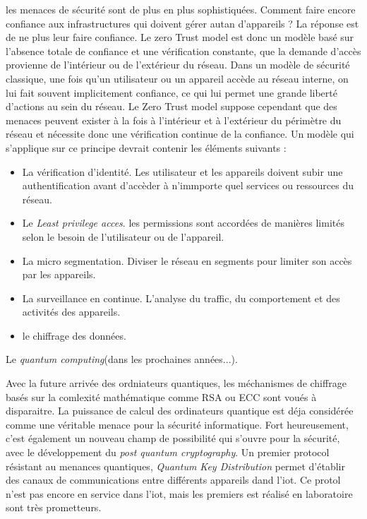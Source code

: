 les menaces de sécurité sont de plus en plus sophistiquées. Comment faire encore confiance aux infrastructures qui doivent gérer autan d'appareils ? La réponse est de ne plus leur faire confiance. Le zero Trust model est donc un modèle basé sur l'absence totale de confiance et une vérification constante, que la demande d'accès provienne de l'intérieur ou de l'extérieur du réseau. Dans un modèle de sécurité classique, une fois qu'un utilisateur ou un appareil accède au réseau interne, on lui fait souvent implicitement confiance, ce qui lui permet une grande liberté d'actions au sein du réseau. Le Zero Trust model suppose cependant que des menaces peuvent exister à la fois à l’intérieur et à l’extérieur du périmètre du réseau et nécessite donc une vérification continue de la confiance. Un modèle qui s'applique sur ce principe devrait contenir les éléments suivants\cite{zero1} :
\begin{itemize}
\item La vérification d'identité. Les utilisateur et les appareils doivent subir une authentification avant d'accèder à n'immporte quel services ou ressources du réseau.
\item Le \textit{Least privilege acces}. les permissions sont accordées de manières limités selon le besoin de l'utilisateur ou de l'appareil.
\item La micro segmentation. Diviser le réseau en segments pour limiter son accès par les appareils.
\item La surveillance en continue. L'analyse du traffic, du comportement et des activités des appareils.
\item le chiffrage des données.
\end{itemize}

\vspace{0.1cm}

Le \textit{quantum computing}(dans les prochaines années...).

Avec la future arrivée des ordniateurs quantiques, les méchanismes de chiffrage basés sur la comlexité mathématique comme RSA ou ECC sont voués à disparaitre\cite{quantumcrypto}. La puissance de calcul des ordinateurs quantique est déja considérée comme une véritable menace pour la sécurité informatique. Fort heureusement, c'est également un nouveau champ de possibilité qui s'ouvre pour la sécurité, avec le développement du \textit{post quantum cryptography}. Un premier protocol résistant au menances quantiques, \textit{Quantum Key Distribution} permet d'établir des canaux de communications entre différents appareils dand l'iot. Ce protol n'est pas encore en service dans l'iot, mais les premiers est réalisé en laboratoire sont très prometteurs\cite{qinternet}.

